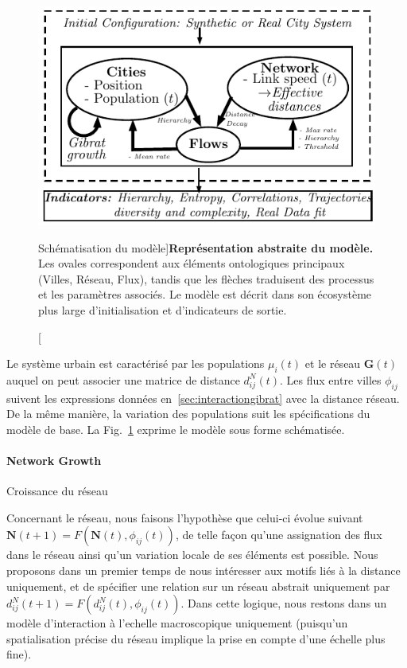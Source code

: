 \begin{figure}
\includegraphics[width=\linewidth]{Figures/MacroCoEvol/model}
\caption[Schematic Model Representation][Schématisation du modèle]{}{\textbf{Représentation abstraite du modèle.} Les ovales correspondent aux éléments ontologiques principaux (Villes, Réseau, Flux), tandis que les flèches traduisent des processus et les paramètres associés. Le modèle est décrit dans son écosystème plus large d'initialisation et d'indicateurs de sortie.\label{fig:macrocoevol:model}}
\end{figure}


Le système urbain est caractérisé par les populations $\mu_i(t)$ et le réseau $\mathbf{G}(t)$ auquel on peut associer une matrice de distance $d^N_{ij}(t)$. Les flux entre villes $\phi_{ij}$ suivent les expressions données en~\ref{sec:interactiongibrat} avec la distance réseau. De la même manière, la variation des populations suit les spécifications du modèle de base. La Fig.~\ref{fig:macrocoevol:model} exprime le modèle sous forme schématisée.




\paragraph{Network Growth}{Croissance du réseau}


Concernant le réseau, nous faisons l'hypothèse que celui-ci évolue suivant $\mathbf{N}(t + 1) = F(\mathbf{N}(t),\phi_{ij}(t))$, de telle façon qu'une assignation des flux dans le réseau ainsi qu'un variation locale de ses éléments est possible. Nous proposons dans un premier temps de nous intéresser aux motifs liés à la distance uniquement, et de spécifier une relation sur un réseau abstrait uniquement par $d^N_{ij}(t+1) = F(d^N_{ij}(t),\phi_{ij}(t))$. Dans cette logique, nous restons dans un modèle d'interaction à l'echelle macroscopique uniquement (puisqu'un spatialisation précise du réseau implique la prise en compte d'une échelle plus fine).

